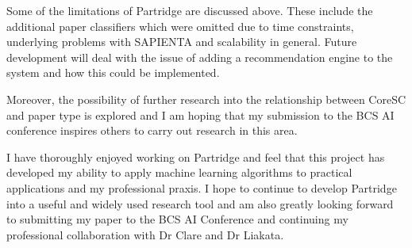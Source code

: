 Some of the limitations of Partridge are discussed above. These include the
additional paper classifiers which were omitted due to time constraints,
underlying problems with SAPIENTA and scalability in general. Future
development will deal with the issue of adding a recommendation engine to the
system and how this could be implemented.

Moreover, the possibility of further research into the relationship between
CoreSC and paper type is explored and I am hoping that my submission to the BCS
AI conference inspires others to carry out research in this area. 

I have thoroughly enjoyed working on Partridge and feel that this project has
developed my ability to apply machine learning algorithms to practical
applications and my professional praxis. I hope to continue to develop
Partridge into a useful and widely used research tool and am also
greatly looking forward to submitting my paper to the BCS AI Conference and
continuing my professional collaboration with Dr Clare and Dr Liakata. 
